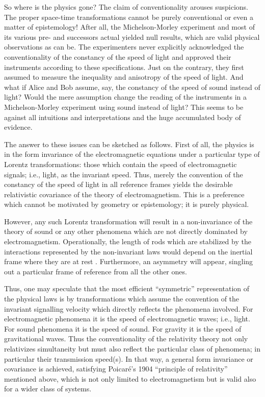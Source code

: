 So where is the physics gone?
The claim of conventionality arouses suspicions.
The proper space-time transformations cannot be purely conventional or
even a matter of epistemology!
After all, the Michelson-Morley experiment and most of its various pre-
and successors actual yielded null results, which are valid physical
observations as can be.
The experimenters never explicitly acknowledged the conventionality of
the constancy of the speed of light and approved their instruments
according to these specifications.
Just on the contrary, they first assumed to measure the inequality
and anisotropy of the speed of light.
And what if Alice and Bob assume, say, the constancy of the speed of
sound instead of light?
Would the mere assumption change the reading of the instruments in a
Michelson-Morley experiment using sound instead of light?
This seems to be against all intuitions and interpretations and the
huge accumulated body of evidence.

The answer to these issues can be sketched as follows.
First of all, the physics is in the form invariance of the
electromagnetic equations under a particular type of Lorentz
transformations: those which contain the speed of electromagnetic
signals; i.e., light, as the invariant speed.
Thus, merely the convention of the constancy of the speed of light in
all reference frames yields the desirable relativistic covariance of the
theory of electromagnetism.
This is a preference which cannot be motivated by geometry or
epistemology; it is purely physical.


However, any such Lorentz transformation will result in a non-invariance
of the theory of sound or any other phenomena which are not directly
dominated by electromagnetism.
Operationally,  the length of rods which are
stabilized by the interactions represented by
the non-invariant laws would depend on the inertial frame where they are at rest
\cite{peres-84}.
Furthermore, an asymmetry will appear, singling
out a particular frame of reference from all the other ones.

Thus, one may speculate that the most efficient
``symmetric'' representation  of the physical laws is by
transformations which assume the convention  of the invariant signalling
velocity which directly reflects the phenomena involved.
For electromagnetic phenomena it is the speed of electromagnetic waves;
i.e., light.
For sound phenomena it is the speed of sound.
For gravity it is the speed of gravitational waves.
Thus the conventionality of the relativity theory not only relativizes
simultaneity
but must also reflect the particular class of phenomena; in particular
their transmission speed(s).
In that way, a general form invariance or covariance is achieved,
satisfying  Poicar\'e's 1904 ``principle of relativity'' mentioned above,
which is not only limited to electromagnetism but is valid also for a
wider class of systems.



